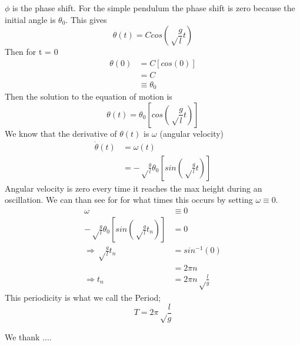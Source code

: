\documentclass[iop]{emulateapj}
\begin{document}
$\phi$ is the phase shift. For the simple pendulum the phase shift is zero 
because the initial angle is $\theta_0$. This gives\\
\begin{equation*}
\theta(t) = Ccos(\sqrt\frac{g}{l}t)
\end{equation*}
Then for t = 0
\begin{align*}
\theta(0) & = C[cos(0)]\\
& = C\\
& \equiv \theta_0
\end{align*}
Then the solution to the equation of motion is
\begin{equation}
\boxed{\theta(t) = \theta_0[cos(\sqrt\frac{g}{l}t)]}
\end{equation}
We know that the derivative of $\theta(t)$ is $\omega$ (angular velocity)
\begin{align*}
\dot{\theta}(t) & = \omega(t)\\
& = -\sqrt\frac{g}{l}\theta_0[sin(\sqrt\frac{g}{l}t)]
\end{align*}
Angular velocity is zero every time it reaches the max height during an oscillation. We can than see for
for what times this occurs by setting $\omega \equiv 0$.
\begin{align*}
\omega & \equiv 0\\
-\sqrt\frac{g}{l}\theta_0[sin(\sqrt\frac{g}{l}t_n)] & = 0\\
\Rightarrow \sqrt\frac{g}{l}t_n & = sin^{-1}(0)\\
& = 2\pi n\\
\Rightarrow t_n & = 2\pi n\sqrt\frac{l}{g}
\end{align*}
This periodicity is what we call the Period;
\begin{equation}
\boxed{T = 2\pi \sqrt\frac{l}{g}}
\end{equation}










\acknowledgments


We thank ....










\begin{thebibliography}{}




\end{thebibliography}{}
\end{document}
